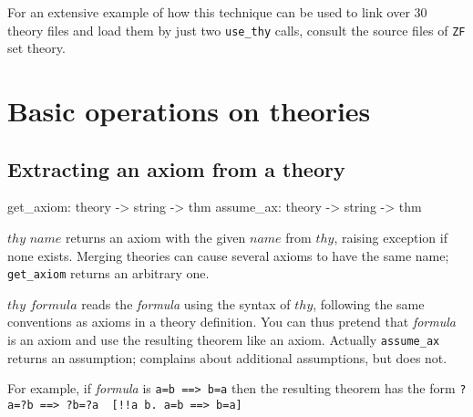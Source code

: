For an extensive example of how this technique can be used to link over 30
theory files and load them by just two {\tt use_thy} calls, consult the 
source files of {\tt ZF} set theory.



\section{Basic operations on theories}
\subsection{Extracting an axiom from a theory}
\begin{ttbox} 
get_axiom: theory -> string -> thm
assume_ax: theory -> string -> thm
\end{ttbox}
\begin{ttdescription}
\item[\ttindexbold{get_axiom} $thy$ $name$] 
returns an axiom with the given $name$ from $thy$, raising exception
 if none exists.  Merging theories can cause several axioms
to have the same name; {\tt get_axiom} returns an arbitrary one.

\item[\ttindexbold{assume_ax} $thy$ $formula$] 
  reads the {\it formula} using the syntax of $thy$, following the same
  conventions as axioms in a theory definition.  You can thus pretend that
  {\it formula} is an axiom and use the resulting theorem like an axiom.
  Actually {\tt assume_ax} returns an assumption;  
  complains about additional assumptions, but  does not.

For example, if {\it formula} is
\hbox{\tt a=b ==> b=a} then the resulting theorem has the form
\hbox{\verb'?a=?b ==> ?b=?a  [!!a b. a=b ==> b=a]'}
\end{ttdescription}

